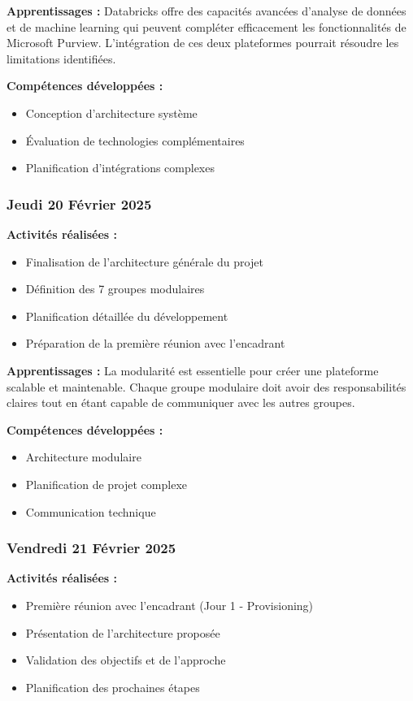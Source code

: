\documentclass[12pt,a4paper]{article}
\begin{document}
\textbf{Apprentissages :}
Databricks offre des capacités avancées d'analyse de données et de machine learning qui peuvent compléter efficacement les fonctionnalités de Microsoft Purview. L'intégration de ces deux plateformes pourrait résoudre les limitations identifiées.

\textbf{Compétences développées :}
\begin{itemize}
    \item Conception d'architecture système
    \item Évaluation de technologies complémentaires
    \item Planification d'intégrations complexes
\end{itemize}

\subsubsection{Jeudi 20 Février 2025}
\textbf{Activités réalisées :}
\begin{itemize}
    \item Finalisation de l'architecture générale du projet
    \item Définition des 7 groupes modulaires
    \item Planification détaillée du développement
    \item Préparation de la première réunion avec l'encadrant
\end{itemize}

\textbf{Apprentissages :}
La modularité est essentielle pour créer une plateforme scalable et maintenable. Chaque groupe modulaire doit avoir des responsabilités claires tout en étant capable de communiquer avec les autres groupes.

\textbf{Compétences développées :}
\begin{itemize}
    \item Architecture modulaire
    \item Planification de projet complexe
    \item Communication technique
\end{itemize}

\subsubsection{Vendredi 21 Février 2025}
\textbf{Activités réalisées :}
\begin{itemize}
    \item Première réunion avec l'encadrant (Jour 1 - Provisioning)
    \item Présentation de l'architecture proposée
    \item Validation des objectifs et de l'approche
    \item Planification des prochaines étapes
\end{itemize}
\end{document}
